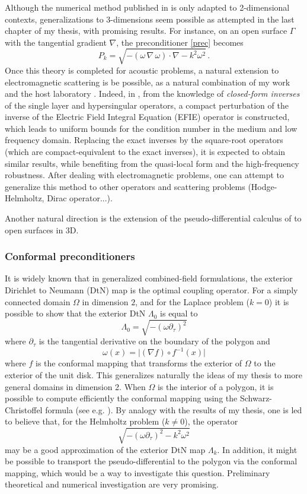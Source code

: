 \documentclass[]{article}
\begin{document}
Although the numerical method published in \cite{alouges2019new} is only adapted to 2-dimensional contexts, generalizations to 3-dimensions seem possible as attempted in the last chapter of my thesis, with promising results. For instance, on an open surface $\Gamma$ with the tangential gradient $\nabla$, the preconditioner \eqref{prec} becomes
\[P_k = \sqrt{-(\omega\,\nabla \,\omega)  \cdot \nabla - k^2 \omega^2}\,.\]
Once this theory is completed for acoustic problems, a natural extension to electromagnetic scattering is be possible, as a natural combination of my work and the host laboratory \cite{hiptmair2019preconditioning}. Indeed, in \cite{hiptmair2019preconditioning}, from the knowledge of \textit{closed-form inverses} of the single layer and hypersingular operators, a compact perturbation of the inverse of the Electric Field Integral Equation (EFIE) operator is constructed, which leads to uniform bounds for the condition number in the medium and low frequency domain. Replacing the exact inverses by the square-root operators (which are compact-equivalent to the exact inverses), it is expected to obtain similar results, while benefiting from the quasi-local form and the high-frequency robustness. After dealing with electromagnetic problems, one can attempt to generalize this method to other operators and scattering problems (Hodge-Helmholtz, Dirac operator...).

Another natural direction is the extension of the pseudo-differential calculus of \cite{averseng2019pseudo} to open surfaces in 3D. 

\subsubsection*{Conformal preconditioners}

It is widely known that in generalized combined-field formulations, the exterior Dirichlet to Neumann (DtN) map is the optimal coupling operator. For a simply connected domain $\Omega$ in dimension $2$, and for the Laplace problem ($k = 0$) it is possible to show that the exterior DtN $\Lambda_0$ is equal to 
\[\Lambda_0 = \sqrt{-(\omega \partial_\tau)^2}\]
where $\partial_\tau$ is the tangential derivative on the boundary of the polygon and \[\omega(x) = \lvert (\nabla f) \circ f^{-1}(x)\rvert\] 
where $f$ is the conformal mapping that transforms the exterior of $\Omega$ to the exterior of the unit disk. This generalizes naturally the ideas of my thesis to more general domains in dimension 2. When $\Omega$ is the interior of a polygon, it is possible to compute efficiently the conformal mapping using the Schwarz-Christoffel formula (see e.g. \cite{driscoll2002schwarz}). By analogy with the results of my thesis, one is led to believe that, for the Helmholtz problem ($k \neq 0$), the operator
\[\sqrt{-(\omega \partial_\tau)^2 - k^2\omega^2}\]
may be a good approximation of the exterior DtN map $\Lambda_k$. In addition, it might be possible to transport the pseudo-differential to the polygon via the conformal mapping, which would be a way to investigate this question. Preliminary theoretical and numerical investigation are very promising. 
\end{document}
